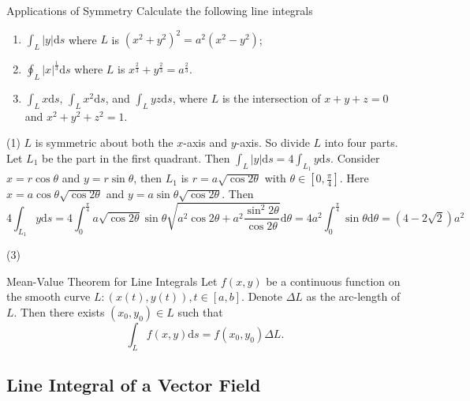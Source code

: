 \begin{example}{Applications of Symmetry}{}
  Calculate the following line integrals
  \begin{enumerate}
  \item $\int_L|y|\mathrm{d} s$ where $L$ is $(x^2 + y^2)^2 = a^2(x^2 - y^2)$;
  \item $\oint _L|x|^{\frac{1}{3}}\mathrm{d} s$ where
    $L$ is $x^{\frac{2}{3}} + y^{\frac{2}{3}} = a^{\frac{2}{3}}$.
  \item $\int_L x\mathrm{d} s$, $\int_L x^2\mathrm{d} s$, and
    $\int_Lyz\mathrm{d}s$, where $L$ is the intersection of
    $x+y+z=0$ and $x^2+y^2+z^2 = 1$.
  \end{enumerate}
\end{example}

\begin{solution}
  (1) $L$ is symmetric about both the $x$-axis and $y$-axis.
  So divide $L$ into four parts. Let $L_1$ be the part in the first quadrant.
  Then $\int_L|y|\mathrm{d}s = 4\int_{L_1}y \mathrm{d} s$.
  Consider $x = r \cos \theta$ and $y = r \sin \theta$, then $L_1$ is $r = a
  \sqrt{\cos 2\theta}$ with $\theta \in [0, \frac{\pi}{4}]$.
  Here $x = a \cos \theta \sqrt{\cos 2\theta}$ and $y = a \sin \theta \sqrt{\cos
  2\theta}$. Then
  \begin{equation}
    4\int_{L_1}y\mathrm{d} s
    = 4 \int_0^{\frac{\pi}{4}} a \sqrt{\cos 2\theta} \sin \theta \sqrt{a^2 \cos 2\theta + a^2 \frac{\sin^2 2\theta}{\cos 2\theta}} \mathrm{d} \theta
    = 4 a^2 \int_0^{\frac{\pi}{4}} \sin \theta \mathrm{d} \theta = (4 - 2 \sqrt{2})a^2
  \end{equation}

  (3)
\end{solution}

\begin{theorem}{Mean-Value Theorem for Line Integrals}{}
  Let $f(x, y)$ be a continuous function on the smooth curve
  $L: (x(t), y(t)), t \in [a, b]$.
  Denote $\Delta L$ as the arc-length of $L$.
  Then there exists $(x_0, y_0) \in L$ such that
  \begin{equation}
    \int_L f(x, y)\mathrm{d} s = f(x_0, y_0)\Delta L.
  \end{equation}
\end{theorem}

\subsection{Line Integral of a Vector Field}

